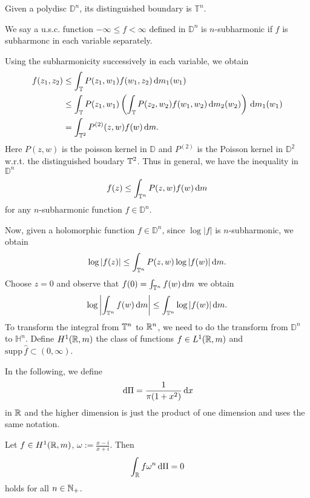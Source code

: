 Given a polydisc $\mathbb{D}^{n}$, its distinguished boundary is $\mathbb{T}^{n}$.

\begin{definition}
	We say a u.s.c. function $-\infty\le f<\infty$ defined in $\mathbb{D}^{n}$ is $n$-subharmonic if $f$ is subharmonc in each variable separately.
\end{definition}
Using the subharmonicity successively in each variable, we obtain
\begin{equation}
	\begin{aligned}
	f(z_1,z_2)&\le \int_{\mathbb{T}}P(z_1,w_1)f(w_1,z_2)\,\mathrm{d} m_1(w_1)\\
		  &\le \int_{\mathbb{T}}P(z_1,w_1)\left( \int_{\mathbb{T}}P(z_2,w_2)f(w_1,w_2)\,\mathrm{d} m_2(w_2) \right) \,\mathrm{d} m_1(w_1)\\
		  &=\int_{\mathbb{T}^2}P^{(2)}(z,w)f(w)\,\mathrm{d} m.
        \end{aligned}
\end{equation}
Here $P(z,w)$ is the poisson kernel in $\mathbb{D}$ and $P^{(2)}$ is the Poisson kernel in $\mathbb{D}^{2}$ w.r.t. the distinguished boudary $\mathbb{T}^{2}$. Thus in general, we have the inequality in $\mathbb{D}^{n}$ 
\begin{equation}
	f(z)\le \int_{\mathbb{T}^{n}}P(z,w)f(w)\,\mathrm{d} m
\end{equation}
for any $n$-subharmonic function $f\in \mathbb{D}^{n}$. 

Now, given a holomorphic function $f\in \mathbb{D}^{n}$, since $\log|f|$ is $n$-subharmonic, we obtain
\begin{equation}
	\log|f(z)|\le \int_{\mathbb{T} ^{n}}P(z,w)\log|f(w)|\,\mathrm{d} m.
\end{equation}
Choose $z=0$ and observe that $f(0)=\int_{\mathbb{T}^{n}}f(w)\,\mathrm{d} m$ we obtain
\begin{equation}
	\log \left|\int_{\mathbb{T}^{n}} f(w)\,\mathrm{d} m\right|\le \int_{\mathbb{T} ^{n}}\log|f(w)|\,\mathrm{d} m. 
\end{equation}
To transform the integral from $\mathbb{T}^{n} $ to $\mathbb{R}^{n}$, we need to do the transform from $\mathbb{D}^{n}$ to $\mathbb{H}^{n}$. Define $H^{1}(\mathbb{R},m)$ the class of functions $f\in L^{1}(\mathbb{R},m)$ and  $\mathrm{supp}\,\widehat{f}\subset (0,\infty)$.

In the following, we define
\[
\,\mathrm{d} \Pi= \frac{1}{\pi(1+x^2)}\,\mathrm{d} x
\] 
in $\mathbb{R}$ and the higher dimension is just the product of one dimension and uses the same notation.


\begin{lemma}
	Let $f\in H^{1}(\mathbb{R},m)$, $\omega:= \frac{x-i}{x+i}$. Then
	\begin{equation}
		\int_{\mathbb{R}}f\omega^{n}\,\mathrm{d} \Pi=0\label{key}
	\end{equation}holds for all $n\in \mathbb{N}_{+}$.
\end{lemma}

